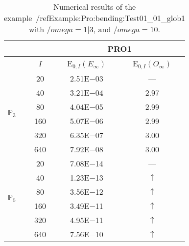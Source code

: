 \begin{table}[H]
\caption{Numerical results of the example~/ref{Example:Pro:bending:Test01_01_glob1} with $/omega=1|3$, and $/omega=10$.}
\setlength{\tabcolsep}{5pt}
\centering
\begin{tabular}{@{}l c c c@{}}
\toprule
 &  & \multicolumn{2}{c}{PRO1}\\
\midrule
 & $I$ & E$_{0,I}(E_{\infty})$ & E$_{0,I}(O_{\infty})$\\
\midrule
\multirow{6}{*}{$\mathbb{P}_{3}$}
 & 20 & 2.51E$-$03 & ---\\
 & 40 & 3.21E$-$04 & 2.97\\
 & 80 & 4.04E$-$05 & 2.99\\
 & 160 & 5.07E$-$06 & 2.99\\
 & 320 & 6.35E$-$07 & 3.00\\
 & 640 & 7.92E$-$08 & 3.00\\
\midrule
\multirow{6}{*}{$\mathbb{P}_{5}$}
 & 20 & 7.08E$-$14 & ---\\
 & 40 & 1.23E$-$13 & $\uparrow$\\
 & 80 & 3.56E$-$12 & $\uparrow$\\
 & 160 & 3.49E$-$11 & $\uparrow$\\
 & 320 & 4.95E$-$11 & $\uparrow$\\
 & 640 & 7.56E$-$10 & $\uparrow$\\
\bottomrule
\end{tabular}
\label{Table:PRO:test_01_01_test12_pro1}
\end{table}
